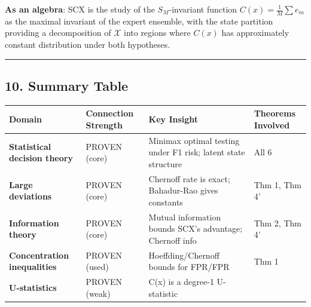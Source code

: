 \documentclass[
  12pt,
]{ctexart}
\begin{document}
\textbf{As an algebra}: SCX is the study of the \(S_M\)-invariant
function \(C(x) = \frac{1}{M}\sum e_m\) as the maximal invariant of the
expert ensemble, with the state partition providing a decomposition of
\(\mathcal{X}\) into regions where \(C(x)\) has approximately constant
distribution under both hypotheses.

\begin{center}\rule{0.5\linewidth}{0.5pt}\end{center}

\subsection{10. Summary Table}\label{summary-table}

\begin{longtable}[]{@{}
  >{\raggedright\arraybackslash}p{}
  >{\raggedright\arraybackslash}p{}
  >{\raggedright\arraybackslash}p{}
  >{\raggedright\arraybackslash}p{}@{}}
\toprule\noalign{}
\begin{minipage}[b]{\linewidth}\raggedright
Domain
\end{minipage} & \begin{minipage}[b]{\linewidth}\raggedright
Connection Strength
\end{minipage} & \begin{minipage}[b]{\linewidth}\raggedright
Key Insight
\end{minipage} & \begin{minipage}[b]{\linewidth}\raggedright
Theorems Involved
\end{minipage} \\
\midrule\noalign{}
\endhead
\bottomrule\noalign{}
\endlastfoot
\textbf{Statistical decision theory} & PROVEN (core) & Minimax optimal
testing under F1 risk; latent state structure & All 6 \\
\textbf{Large deviations} & PROVEN (core) & Chernoff rate is exact;
Bahadur-Rao gives constants & Thm 1, Thm 4' \\
\textbf{Information theory} & PROVEN (core) & Mutual information bounds
SCX's advantage; Chernoff info & Thm 2, Thm 4' \\
\textbf{Concentration inequalities} & PROVEN (used) & Hoeffding/Chernoff
bounds for FPR/FPR & Thm 1 \\
\textbf{U-statistics} & PROVEN (weak) & C(x) is a degree-1 U-statistic &

\end{longtable}
\end{document}
